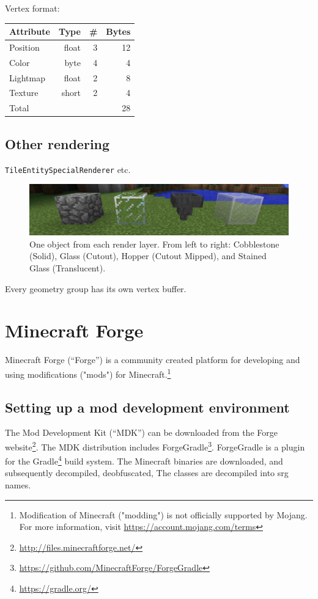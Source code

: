 \documentclass[]{article}
\begin{document}
Vertex format:

\begin{tabular}{|l|r|r|r|} \hline
  Attribute & Type & \# & Bytes\\ \hline
  Position & float & 3 & 12 \\ \hline
  Color & byte & 4 & 4 \\ \hline
  Lightmap & float & 2 & 8 \\ \hline
  Texture & short & 2 & 4 \\ \hline
  Total &   &  & 28 \\ \hline
\end{tabular}

\subsection{Other rendering}
\texttt{TileEntitySpecialRenderer} etc.

\begin{figure}
  \includegraphics[width=\textwidth]{ss-layers.png}
  \centering
  \caption{One object from each render layer. From left to right: Cobblestone (Solid), Glass (Cutout), Hopper (Cutout Mipped), and Stained Glass (Translucent).}
  \label{fig:ss-layers}
\end{figure}
Every geometry group has its own vertex buffer.

\section{Minecraft Forge}
Minecraft Forge (\enquote{Forge}) is a community created platform for developing and using modifications ("mods") for Minecraft.\footnote{Modification of Minecraft ("modding") is not officially supported by Mojang. For more information, visit \url{https://account.mojang.com/terms}}
\subsection{Setting up a mod development environment}
The Mod Development Kit (\enquote{MDK}) can be downloaded from the Forge website\footnote{\url{http://files.minecraftforge.net/}}.
The MDK distribution includes ForgeGradle\footnote{\url{https://github.com/MinecraftForge/ForgeGradle}}.
ForgeGradle is a plugin for the Gradle\footnote{\url{https://gradle.org/}} build system.
The Minecraft binaries are downloaded, and subsequently decompiled, deobfuscated, 
The classes are decompiled into srg names.
\end{document}
